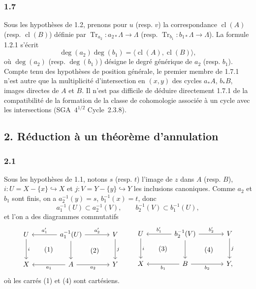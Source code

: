 \documentclass[11pt]{article}
\providecommand{\cl}{\operatorname{cl}}
\providecommand{\Tr}{\operatorname{Tr}}
\providecommand{\Tr}{\operatorname{Tr}}
\providecommand{\Tr}{\operatorname{Tr}}
\providecommand{\Tr}{\operatorname{Tr}}
\providecommand{\cl}{\operatorname{cl}}
\providecommand{\cl}{\operatorname{cl}}
\providecommand{\Tr}{\operatorname{Tr}}
\begin{document}
\subsubsection*{1.7}
Sous les hypothèses de 1.2, prenons pour $u$ (resp. $v$) la correspondance $\cl(A)$ (resp. $\cl(B)$) définie par $\Tr_{a_2}:a_{2*}\Lambda\to\Lambda$ (resp. $\Tr_{b_1}:b_{1*}\Lambda\to\Lambda$). La formule 1.2.1 s'écrit
\begin{equation}\tag{1.7.1}
\deg(a_2)\deg(b_1)=\langle \cl(A),\cl(B)\rangle,
\end{equation}
où $\deg(a_2)$ (resp. $\deg(b_1)$) désigne le degré générique de $a_2$ (resp. $b_1$). Compte tenu des hypothèses de position générale, le premier membre de 1.7.1 n'est autre que la multiplicité d'intersection en $(x,y)$ des cycles $a_*A$, $b_*B$, images directes de $A$ et $B$. Il n'est pas difficile de déduire directement 1.7.1 de la compatibilité de la formation de la classe de cohomologie associée à un cycle avec les intersections (SGA~$4^{1/2}$ Cycle~2.3.8).


\subsection*{2. Réduction à un théorème d'annulation}

\subsubsection*{2.1}
Sous les hypothèses de 1.1, notons $s$ (resp. $t$) l'image de $z$ dans $A$ (resp. $B$), $i:U=X-\{x\}\hookrightarrow X$ et $j:V=Y-\{y\}\hookrightarrow Y$ les inclusions canoniques. Comme $a_2$ et $b_1$ sont finis, on a $a_2^{-1}(y)=s$, $b_1^{-1}(x)=t$, donc
\[
a_1^{-1}(U)\subset a_2^{-1}(V),\qquad b_2^{-1}(V)\subset b_1^{-1}(U),
\]
et l'on a des diagrammes commutatifs
\[
\begin{tikzcd}[column sep=large,row sep=large]
U \arrow[d,"i"] \arrow[rd,phantom,"(1)"{description}] & a_1^{-1}(U) \arrow[l,"a'_1"'] \arrow[r,"a'_2"] \arrow[d] \arrow[rd,phantom,"(2)"{description}] & V \arrow[d,"j"]\\
X & A \arrow[l,"a_1"] \arrow[r,"a_2"'] & Y
\end{tikzcd}
\qquad
\begin{tikzcd}[column sep=large,row sep=large]
U \arrow[d,"i"] \arrow[rd,phantom,"(3)"{description}] & b_2^{-1}(V) \arrow[l,"b'_1"'] \arrow[r,"b'_2"] \arrow[d] \arrow[rd,phantom,"(4)"{description}] & V \arrow[d,"j"]\\
X & B \arrow[l,"b_1"] \arrow[r,"b_2"'] & Y ,
\end{tikzcd}
\]
où les carrés (1) et (4) sont cartésiens.
\end{document}
